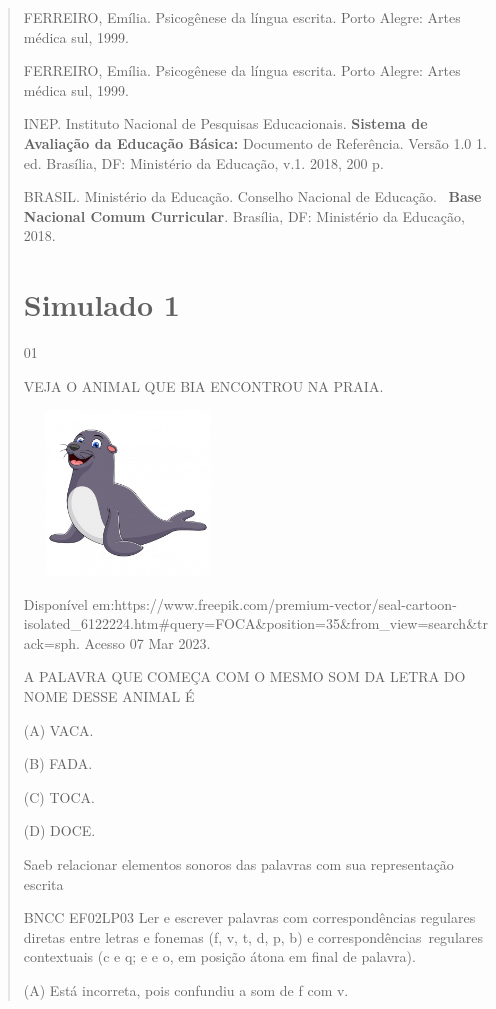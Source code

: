 \begin{verse}
{{{{{{FERREIRO, Emília. Psicogênese da língua escrita. Porto Alegre: Artes
médica sul, 1999.

FERREIRO, Emília. Psicogênese da língua escrita. Porto Alegre: Artes
médica sul, 1999.

INEP. Instituto Nacional de Pesquisas Educacionais. \textbf{Sistema de
Avaliação da Educação Básica:} Documento de Referência. Versão 1.0 1.
ed. Brasília, DF: Ministério da Educação, v.1. 2018, 200 p.

BRASIL. Ministério da Educação. Conselho Nacional de Educação.~
\textbf{Base Nacional Comum Curricular}. Brasília, DF: Ministério da
Educação, 2018.

\chapter{Simulado 1}

\num{01}

VEJA O ANIMAL QUE BIA ENCONTROU NA PRAIA.

\includegraphics[width=2.16528in,height=1.72778in]{media/image139.jpeg}

Disponível
em:https://www.freepik.com/premium-vector/seal-cartoon-isolated\_6122224.htm\#query=FOCA\&position=35\&from\_view=search\&track=sph.
Acesso 07 Mar 2023.

A PALAVRA QUE COMEÇA COM O MESMO SOM DA LETRA DO NOME DESSE ANIMAL É

(A) VACA.

(B) FADA.

(C) TOCA.

(D) DOCE.

Saeb relacionar elementos sonoros das palavras com sua representação
escrita

BNCC EF02LP03 Ler e escrever palavras com correspondências regulares
diretas entre letras e fonemas (f, v, t, d, p, b) e
correspondências~regulares contextuais (c e q; e e o, em posição átona
em final de palavra).

\protect\hypertarget{_Hlk129501253}{}{}(A) Está incorreta, pois
confundiu a som de f com v.

}}}}}}
\end{verse}
